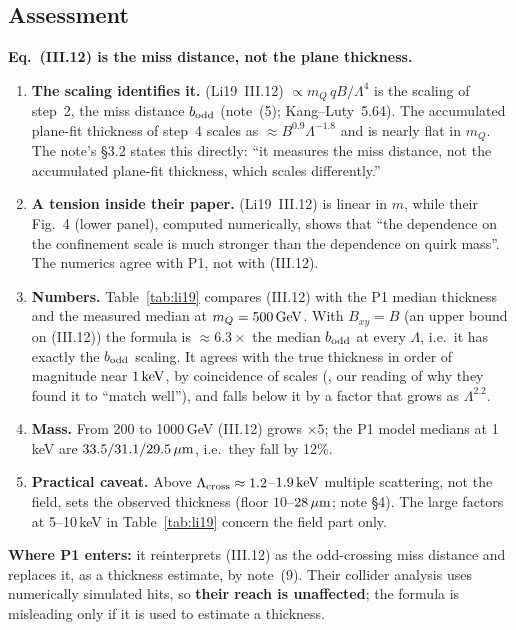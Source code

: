 \documentclass[11pt]{article}
\newcommand{\vhead}[1]{\noindent\textbf{\textsf{#1}}\par\smallskip}
\begin{document}
\subsection{Assessment}
\begin{verdict}
\vhead{Eq.~(III.12) is the miss distance, not the plane thickness.}
\begin{enumerate}[leftmargin=*]
\item \textbf{The scaling identifies it.} (Li19~III.12) $\propto m_Q\,qB/\Lambda^4$ is the scaling of step~2, the miss
  distance $b_{\rm odd}$ (note~(5); Kang--Luty~5.64). The accumulated plane-fit thickness of step~4 scales as
  $\approx B^{0.9}\Lambda^{-1.8}$ and is nearly flat in $m_Q$. The note's \S3.2 states this directly: ``it measures the miss distance, not the accumulated plane-fit thickness, which scales differently.''
\item \textbf{A tension inside their paper.} (Li19~III.12) is linear in $m$, while their Fig.~4 (lower panel), computed
  numerically, shows that ``the dependence on the confinement scale is much stronger than the dependence on quirk mass''.
  The numerics agree with P1, not with (III.12).
\item \textbf{Numbers.} Table~\ref{tab:li19} compares (III.12) with the P1 median thickness and the measured median at
  $m_Q=500\,\mathrm{GeV}$. With $B_{xy}=B$ (an upper bound on (III.12)) the formula is $\approx6.3\times$ the median $b_{\rm odd}$ at every
  $\Lambda$, i.e.\ it has exactly the $b_{\rm odd}$ scaling. It agrees with the true thickness in order of magnitude near
  $1\,\mathrm{keV}$, by coincidence of scales (\EST{}, our reading of why they found it to ``match well''), and falls below it
  by a factor that grows as $\Lambda^{2.2}$.
\item \textbf{Mass.} From 200 to 1000\,GeV (III.12) grows $\times5$; the P1 model medians at 1\,keV are
  $33.5/31.1/29.5\,\mu\mathrm{m}$, i.e.\ they fall by 12\%.
\item \textbf{Practical caveat.} Above $\Lambda_{\rm cross}\approx1.2$--$1.9\,\mathrm{keV}$ multiple scattering, not the field, sets the
  observed thickness (floor $10$--$28\,\mu\mathrm{m}$; note \S4). The large factors at 5--10\,keV in Table~\ref{tab:li19} concern
  the field part only.
\end{enumerate}
\textbf{Where P1 enters:} it reinterprets (III.12) as the odd-crossing miss distance and replaces it, as a thickness
estimate, by note~(9). Their collider analysis uses numerically simulated hits, so \textbf{their reach is unaffected}; the
formula is misleading only if it is used to estimate a thickness.
\end{verdict}
\end{document}
